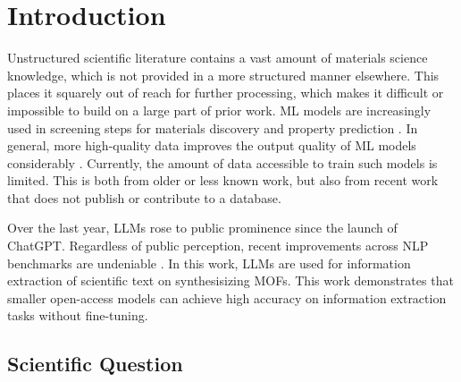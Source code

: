 \chapter{Introduction}\label{chap:introduction}

Unstructured scientific literature contains a vast amount of materials science knowledge, which is not provided in a more structured manner elsewhere.
This places it squarely out of reach for further processing, which makes it difficult or impossible to build on a large part of prior work.
\gls{ML} models are increasingly used in screening steps for materials discovery and property prediction \cite{saal_machine_2020, luo_mof_2022, choudhary_recent_2022}.
In general, more high-quality data improves the output quality of \gls{ML} models considerably \cite{hoffmann_empirical_2022}.
Currently, the amount of data accessible to train such models is limited. This is both from older or less known work, but also from recent work that does not publish or contribute to a database.

Over the last year, \glspl{LLM} rose to public prominence since the launch of \gls{ChatGPT}.
Regardless of public perception, recent improvements across \gls{NLP} benchmarks are undeniable \cite{devlin_bert_2018, openai_gpt4_2023}.
In this work, \glspl{LLM} are used for information extraction of scientific text on synthesisizing \glspl{MOF}.
This work demonstrates that smaller open-access models can achieve high accuracy on information extraction tasks without fine-tuning.


\section{Scientific Question}\label{sec:question}

